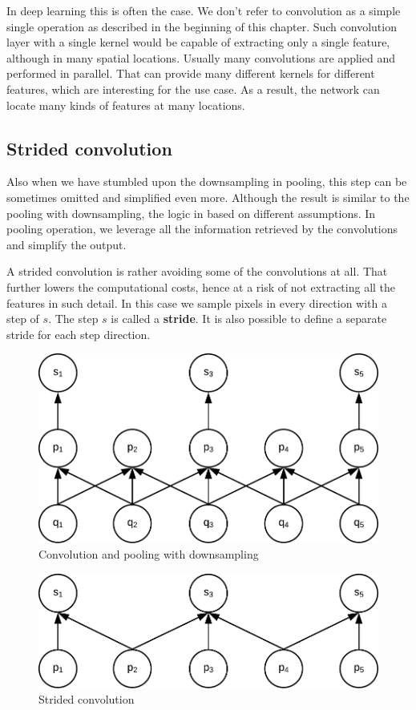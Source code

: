 In deep learning this is often the case. We don't refer to convolution as a simple single operation as described in the beginning of this chapter. Such convolution layer with a single kernel would be capable of extracting only a single feature, although in many spatial locations. Usually many convolutions are applied and performed in parallel. That can provide many different kernels for different features, which are interesting for the use case. As a result, the network can locate many kinds of features at many locations.

\subsection{Strided convolution}
\label{ss:strided}

Also when we have stumbled upon the downsampling in pooling, this step can be sometimes omitted and simplified even more. Although the result is similar to the pooling with downsampling, the logic in based on different assumptions. In pooling operation, we leverage all the information retrieved by the convolutions and simplify the output.

A strided convolution is rather avoiding some of the convolutions at all. That further lowers the computational costs, hence at a risk of not extracting all the features in such detail. In this case we sample pixels in every direction with a step of $s$. The step $s$ is called a \textbf{stride}. It is also possible to define a separate stride for each step direction.

\begin{figure}
    \centering
    \includegraphics[width=.6\textwidth]{obrazky-figures/conv_down.pdf}
    \caption{Convolution and pooling with downsampling}\label{fig:conv_down}
\end{figure}


\begin{figure}
    \centering
    \includegraphics[width=.6\textwidth]{obrazky-figures/strided.pdf}
    \caption{Strided convolution}\label{fig:strided}
\end{figure}

